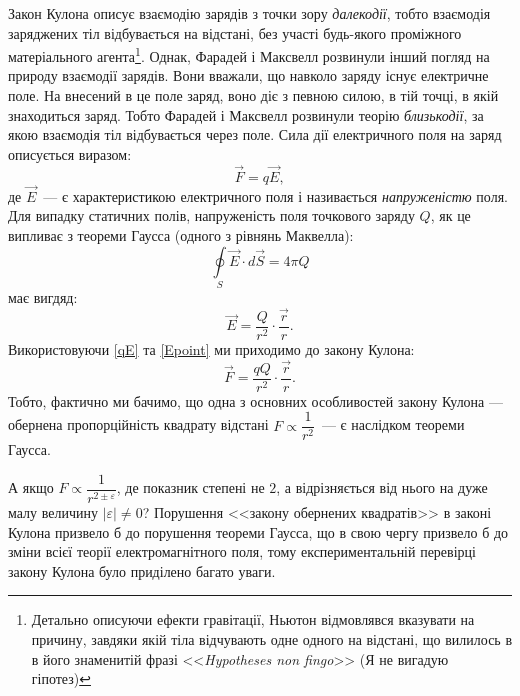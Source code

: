 Закон Кулона описує взаємодію зарядів з точки зору \emph{далекодії}, тобто взаємодія заряджених тіл відбувається на відстані, без участі будь-якого проміжного матеріального агента\footnote{Детально описуючи ефекти гравітації, Ньютон відмовлявся вказувати на причину, завдяки якій тіла відчувають одне одного на відстані, що вилилось в в його знаменитій фразі <<\emph{Hypotheses non fingo}>> (Я не вигадую гіпотез)}. Однак, Фарадей і Максвелл розвинули інший погляд на природу взаємодії зарядів. Вони вважали, що навколо заряду існує електричне поле. На внесений в це поле заряд, воно діє з певною силою, в  тій точці, в якій знаходиться заряд. Тобто Фарадей і Максвелл розвинули теорію \emph{близькодії}, за якою взаємодія тіл відбувається через поле.  Сила дії електричного поля на заряд описується виразом:
\begin{equation}\label{qE}
    \vec{F} = q\vec{E},
\end{equation}
де $\vec{E}$~--- є характеристикою електричного поля і називається \emph{напруженістю} поля. Для випадку статичних полів, напруженість поля точкового заряду $Q$, як це випливає з теореми Гаусса (одного з рівнянь Маквелла):
\begin{equation}\label{Gauss}
    \oint\limits_S \vec{E}\cdot d\vec{S} = 4\pi Q
\end{equation}
 має вигдяд:
\begin{equation}\label{Epoint}
    \vec{E} = \frac{Q}{r^2}\cdot\frac{\vec{r}}{r}.
\end{equation}
Використовуючи \eqref{qE} та \eqref{Epoint} ми приходимо до закону Кулона:
\begin{equation*}\label{}
    \vec{F} = \frac{qQ}{r^2}\cdot\frac{\vec{r}}{r}.
\end{equation*}
Тобто, фактично ми бачимо, що одна з основних особливостей закону Кулона --- обернена пропорційність квадрату відстані $F \propto \dfrac1{r^2}$~--- є наслідком теореми Гаусса.

А якщо $F \propto \dfrac1{r^{2 \pm \varepsilon}}$, де  показник степені не $2$, а відрізняється від нього на дуже малу величину $|\varepsilon| \neq 0$? Порушення <<закону обернених квадратів>> в законі Кулона призвело б до порушення теореми Гаусса, що в свою чергу призвело б до зміни всієї теорії електромагнітного поля, тому експериментальній перевірці закону Кулона було приділено багато уваги.



